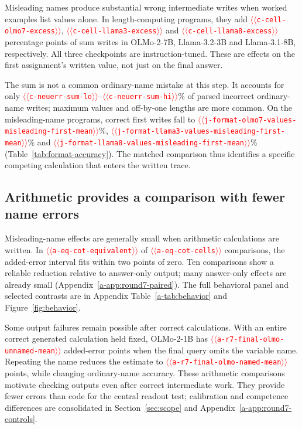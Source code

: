 \documentclass[11pt]{article}
\providecommand{\NUM}[1]{\textcolor{red}{$\langle\langle$\texttt{#1}$\rangle\rangle$}}
\begin{document}
Misleading names produce substantial wrong intermediate writes when worked
examples list values alone. In length-computing
programs, they add \NUM{c-cell-olmo7-excess}, \NUM{c-cell-llama3-excess} and
\NUM{c-cell-llama8-excess} percentage points of sum writes in OLMo-2-7B,
Llama-3.2-3B and Llama-3.1-8B, respectively. All three checkpoints are
instruction-tuned. These are effects on the first assignment's written value,
not just on the final answer.

The sum is not a common ordinary-name mistake at this step. It accounts for
only \NUM{c-neuerr-sum-lo}--\NUM{c-neuerr-sum-hi}\% of parsed incorrect
ordinary-name writes; maximum values and off-by-one lengths are more common.
On the misleading-name programs, correct first writes fall to
\NUM{j-format-olmo7-values-misleading-first-mean}\%,
\NUM{j-format-llama3-values-misleading-first-mean}\% and
\NUM{j-format-llama8-values-misleading-first-mean}\% (Table~\ref{tab:format-accuracy}).
The matched comparison thus identifies a specific competing calculation that
enters the written trace.

\subsection{Arithmetic provides a comparison with fewer name errors}

Misleading-name effects are generally small when arithmetic calculations are
written. In \NUM{a-eq-cot-equivalent} of \NUM{a-eq-cot-cells} comparisons,
the added-error interval fits within two points of zero. Ten comparisons show a
reliable reduction relative to answer-only output; many answer-only effects are
already small (Appendix~\ref{a-app:round7-paired}). The full behavioral panel and
selected contrasts are in Appendix Table~\ref{a-tab:behavior} and
Figure~\ref{fig:behavior}.

Some output failures remain possible after correct calculations. With an entire
correct generated calculation held fixed, OLMo-2-1B has
\NUM{a-r7-final-olmo-unnamed-mean} added-error points when the final query omits
the variable name. Repeating the name reduces the estimate to
\NUM{a-r7-final-olmo-named-mean} points, while changing ordinary-name accuracy.
These arithmetic comparisons motivate checking outputs even after correct
intermediate work. They provide fewer errors than code for the central readout
test; calibration and competence differences are consolidated in
Section~\ref{sec:scope} and Appendix~\ref{a-app:round7-controls}.
\end{document}
